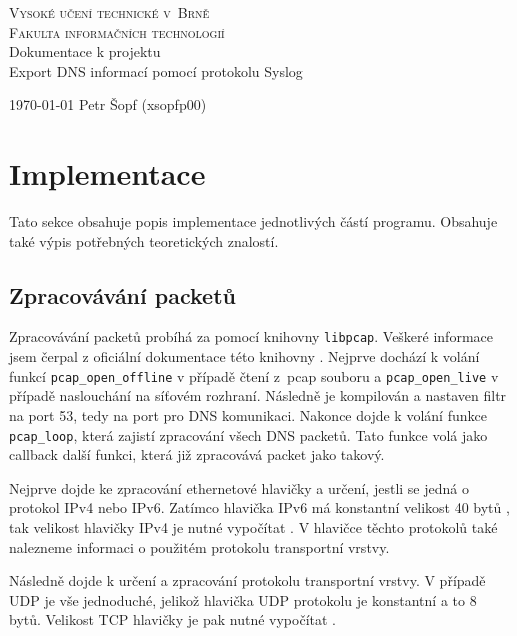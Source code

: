 \documentclass[a4paper, 11pt]{article}
\begin{document}
    \begin{titlepage}
        \begin{center}
            \textsc{\Huge Vysoké učení technické v~Brně}\\[0.6em]
            \textsc{\huge Fakulta informačních technologií}\\
            {\LARGE Dokumentace k projektu} \\[0.3em] {\Huge Export DNS informací pomocí protokolu Syslog}\\
        \end{center}
        {\Large \today \hfill
        Petr Šopf (xsopfp00)}
    \end{titlepage}
    
 
\newpage
  \tableofcontents
\newpage

\section{Implementace}
Tato sekce obsahuje popis implementace jednotlivých částí programu. Obsahuje také výpis potřebných teoretických znalostí.

\subsection{Zpracovávání packetů}
Zpracovávání packetů probíhá za pomocí knihovny \verb|libpcap|. Veškeré informace jsem čerpal z oficiální dokumentace této knihovny \cite{tcpdump:dokumentace}. Nejprve dochází k volání funkcí \verb|pcap_open_offline| v případě čtení z~pcap souboru a \verb|pcap_open_live| v případě naslouchání na síťovém rozhraní. Následně je kompilován a nastaven filtr na port 53, tedy na port pro DNS komunikaci. Nakonce dojde k volání funkce \verb|pcap_loop|, která zajistí zpracování všech DNS packetů. Tato funkce volá jako callback další funkci, která již zpracovává packet jako takový.

Nejprve dojde ke zpracování ethernetové hlavičky a určení, jestli se jedná o protokol IPv4 nebo IPv6. Zatímco hlavička IPv6 má konstantní velikost 40 bytů \cite{Wikipedie:IPv6}, tak velikost hlavičky IPv4 je nutné vypočítat \cite{Wikipedie:IPv4}. V hlavičce těchto protokolů také nalezneme informaci o použitém protokolu transportní vrstvy.

Následně dojde k určení a zpracování protokolu transportní vrstvy. V případě UDP je vše jednoduché, jelikož hlavička UDP protokolu je konstantní a to 8 bytů. Velikost TCP hlavičky je pak nutné vypočítat \cite{Firewall:tcp}.
\end{document}

